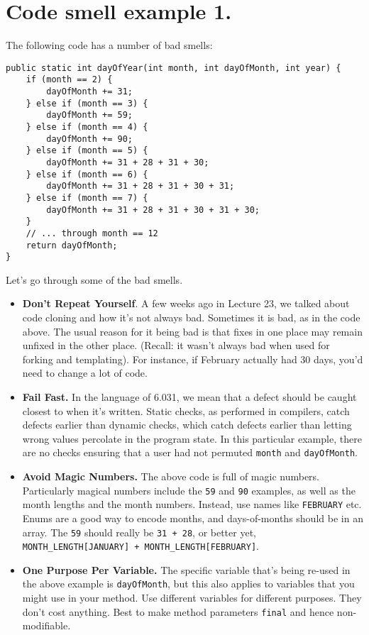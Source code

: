 \documentclass[11pt]{article}
\begin{document}
\newpage
\section*{Code smell example 1.}

The following code has a number of bad smells:
\begin{lstlisting}
public static int dayOfYear(int month, int dayOfMonth, int year) {
    if (month == 2) {
        dayOfMonth += 31;
    } else if (month == 3) {
        dayOfMonth += 59;
    } else if (month == 4) {
        dayOfMonth += 90;
    } else if (month == 5) {
        dayOfMonth += 31 + 28 + 31 + 30;
    } else if (month == 6) {
        dayOfMonth += 31 + 28 + 31 + 30 + 31;
    } else if (month == 7) {
        dayOfMonth += 31 + 28 + 31 + 30 + 31 + 30;
    }
    // ... through month == 12
    return dayOfMonth;
}
\end{lstlisting}

Let's go through some of the bad smells.

\begin{itemize}
\item {\bf Don't Repeat Yourself}. A few weeks ago in Lecture 23, we talked about code cloning
  and how it's not always bad. Sometimes it is bad, as in the code above. The usual reason for it
  being bad is that fixes in one place may remain unfixed in the other place. (Recall: it wasn't
  always bad when used for forking and templating). For instance, if February actually had 30
  days, you'd need to change a lot of code.
\item {\bf Fail Fast.} In the language of 6.031, we mean that a defect should be caught
  closest to when it's written. Static checks, as performed in compilers, catch defects
  earlier than dynamic checks, which catch defects earlier than letting wrong values percolate
  in the program state. In this particular example, there are no checks ensuring that a
  user had not permuted {\tt month} and {\tt dayOfMonth}.
\item {\bf Avoid Magic Numbers.} The above code is full of magic numbers. Particularly
  magical numbers include the {\tt 59} and {\tt 90} examples, as well as the month lengths
  and the month numbers. Instead, use names like {\tt FEBRUARY} etc. Enums are a good way
  to encode months, and days-of-months should be in an array. The {\tt 59} should really be
  {\tt 31 + 28}, or better yet, \verb!MONTH_LENGTH[JANUARY] + MONTH_LENGTH[FEBRUARY]!.
\item {\bf One Purpose Per Variable.} The specific variable that's
  being re-used in the above example is {\tt dayOfMonth}, but this
  also applies to variables that you might use in your method. Use
  different variables for different purposes. They don't cost
  anything. Best to make method parameters {\tt final} and hence
  non-modifiable.
\end{itemize}
\end{document}
